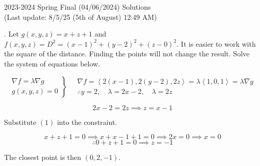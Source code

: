 \documentclass{article}
\begin{document}
\newpage

\begin{center}
2023-2024 Spring Final (04/06/2024) Solutions\\
(Last update: 8/5/25 (5th of August) 12:49 AM)
\end{center}

. Let $g(x,y,z)=x+z+1$ and $f(x,y,z)=D^2=(x-1)^2+(y-2)^2+(z-0)^2$. It is easier to work with the square of the distance. Finding the points will not change the result. Solve the system of equations below.

\[
\left.
\begin{array}{l}
\displaystyle\nabla f=\lambda\nabla g \\
\displaystyle g(x,y,z)=0
\end{array}
\right\}\quad
\begin{array}{l}
\nabla f=\left\langle2(x-1),2(y-2),2z\right\rangle=\lambda\left\langle1,0,1\right\rangle=\lambda\nabla g\\\therefore y=2, \quad\lambda=2x-2,\quad\lambda=2z
\end{array}
\]

\begin{equation}2x-2=2z\implies z=x-1\end{equation}

\hfill

\noindent Substitute $(1)$ into the constraint.

\[x+z+1=0\implies x+x-1+1=0\implies2x=0\implies x=0\]
\[\therefore 0+z+1=0\implies z=-1\]

\hfill

\noindent The closest point is then $\boxed{(0,2,-1)}$.

\hfill
\end{document}
